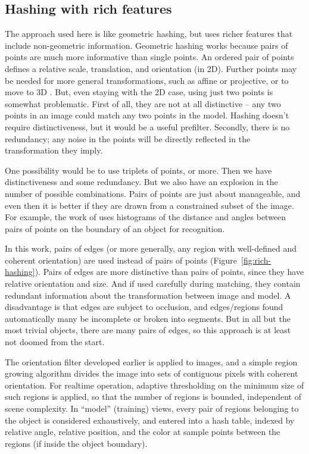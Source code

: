 \subsection{Hashing with rich features}

The approach used here is like geometric hashing, but uses
richer features that include non-geometric information.
%
Geometric hashing works because pairs of points are much more
informative than single points.  An ordered pair of points defines a
relative scale, translation, and orientation (in 2D).  Further points
may be needed for more general transformations, such as affine
or projective, or to move to 3D \cite[]{wolfson97geometric}.
%
But, even staying with the 2D case, using just two points is somewhat
problematic.  First of all, they are not at all distinctive -- any two
points in an image could match any two points in the model.  Hashing
doesn't require distinctiveness, but it would be a useful prefilter.
Secondly, there is no redundancy; any noise in the points will be
directly reflected in the transformation they imply.

One possibility would be to use triplets of points, or more.  Then we
have distinctiveness and some redundancy.  But we also have an
explosion in the number of possible combinations.  Pairs of points are
just about manageable, and even then it is better if they are drawn
from a constrained subset of the image.  For example, the work of
\cite{roy02learning} uses histograms of the distance and angles
between pairs of points on the boundary of an object for recognition.

In this work, pairs of edges (or more generally, any region with
well-defined and coherent orientation) are used instead of pairs of
points (Figure~\ref{fig:rich-hashing}).
%
Pairs of edges are more distinctive than pairs of points,
since they have relative orientation and size.  And if used carefully
during matching, they contain redundant information about the
transformation between image and model.  A disadvantage is that edges
are subject to occlusion, and edges/regions found automatically
many be incomplete or broken into segments.  But in all but the most
trivial objects, there are many pairs of edges, so this approach is
at least not doomed from the start.

The orientation filter developed earlier is applied to images, and a
simple region growing algorithm divides the image into sets of
contiguous pixels with coherent orientation.  For realtime operation,
adaptive thresholding on the minimum size of such regions is applied,
so that the number of regions is bounded, independent of scene
complexity.  In ``model'' (training) views, every pair of regions
belonging to the object is considered exhaustively, and entered into a
hash table, indexed by relative angle, relative position, and the
color at sample points between the regions (if inside the object
boundary).  

